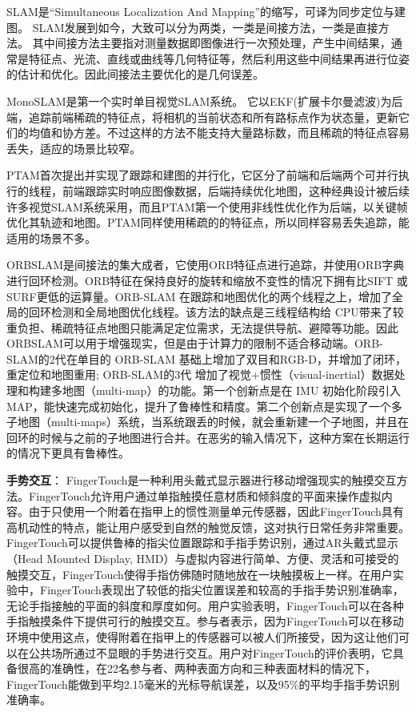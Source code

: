 SLAM是“Simultaneous Localization And Mapping”的缩写，可译为同步定位与建图。
SLAM发展到如今，大致可以分为两类，一类是间接方法，一类是直接方法。
其中间接方法主要指对测量数据即图像进行一次预处理，产生中间结果，通常是特征点、光流、直线或曲线等几何特征等，然后利用这些中间结果再进行位姿的估计和优化。因此间接法主要优化的是几何误差。

MonoSLAM\cite{DavReiMol07}是第一个实时单目视觉SLAM系统。 它以EKF(扩展卡尔曼滤波)为后端，追踪前端稀疏的特征点，将相机的当前状态和所有路标点作为状态量，更新它们的均值和协方差。不过这样的方法不能支持大量路标数，而且稀疏的特征点容易丢失，适应的场景比较窄。

PTAM\cite{KleMur07}首次提出并实现了跟踪和建图的并行化，它区分了前端和后端两个可并行执行的线程，前端跟踪实时响应图像数据，后端持续优化地图，这种经典设计被后续许多视觉SLAM系统采用，而且PTAM第一个使用非线性优化作为后端，以关键帧优化其轨迹和地图。PTAM同样使用稀疏的的特征点，所以同样容易丢失追踪，能适用的场景不多。

ORBSLAM\cite{MurMonTar15}是间接法的集大成者，它使用ORB特征点进行追踪，并使用ORB字典进行回环检测。ORB特征在保持良好的旋转和缩放不变性的情况下拥有比SIFT 或 SURF更低的运算量。ORB-SLAM 在跟踪和地图优化的两个线程之上，增加了全局的回环检测和全局地图优化线程。该方法的缺点是三线程结构给 CPU带来了较重负担、稀疏特征点地图只能满足定位需求，无法提供导航、避障等功能。因此ORBSLAM可以用于增强现实，但是由于计算力的限制不适合移动端。ORB-SLAM的2代\cite{MurTar17}在单目的 ORB-SLAM 基础上增加了双目和RGB-D，并增加了闭环，重定位和地图重用; ORB-SLAM的3代\cite{CamElvRod20} 增加了视觉+惯性（visual-inertial）数据处理和构建多地图（multi-map）的功能。第一个创新点是在 IMU 初始化阶段引入 MAP，能快速完成初始化，提升了鲁棒性和精度。第二个创新点是实现了一个多子地图（multi-maps）系统，当系统跟丢的时候，就会重新建一个子地图，并且在回环的时候与之前的子地图进行合并。在恶劣的输入情况下，这种方案在长期运行的情况下更具有鲁棒性。

\textbf{手势交互}：
FingerTouch\cite{OhParPar20}是一种利用头戴式显示器进行移动增强现实的触摸交互方法。FingerTouch允许用户通过单指触摸任意材质和倾斜度的平面来操作虚拟内容。由于只使用一个附着在指甲上的惯性测量单元传感器，因此FingerTouch具有高机动性的特点，能让用户感受到自然的触觉反馈，这对执行日常任务非常重要。
FingerTouch可以提供鲁棒的指尖位置跟踪和手指手势识别，通过AR头戴式显示（Head Mounted Display, HMD）与虚拟内容进行简单、方便、灵活和可接受的触摸交互，FingerTouch使得手指仿佛随时随地放在一块触摸板上一样。在用户实验中，FingerTouch表现出了较低的指尖位置误差和较高的手指手势识别准确率，无论手指接触的平面的斜度和厚度如何。用户实验表明，FingerTouch可以在各种手指触摸条件下提供可行的触摸交互。参与者表示，因为FingerTouch可以在移动环境中使用这点，使得附着在指甲上的传感器可以被人们所接受，因为这让他们可以在公共场所通过不显眼的手势进行交互。用户对FingerTouch的评价表明，它具备很高的准确性，在22名参与者、两种表面方向和三种表面材料的情况下，FingerTouch能做到平均2.15毫米的光标导航误差，以及95\%的平均手指手势识别准确率。

